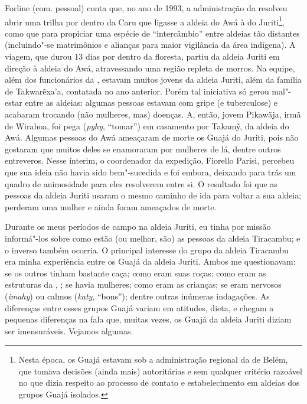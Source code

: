 Forline (com. pessoal) conta que, no ano de 1993, a administração da
 resolveu abrir uma trilha por dentro da  Caru que ligasse a
aldeia do  Awá à do  Juriti\footnote{Nesta época, os Guajá estavam
  sob a administração regional da  de Belém, que tomava decisões
  (ainda mais) autoritárias e sem qualquer critério razoável no que
  dizia respeito ao processo de contato e estabelecimento em aldeias dos
  grupos Guajá isolados.}, como que para propiciar uma espécie de
``intercâmbio'' entre aldeias tão distantes (incluindo"-se matrimônios e
alianças para maior vigilância da área indígena). A viagem, que durou 13
dias por dentro da floresta, partiu da aldeia Juriti em direção à aldeia
do  Awá, atravessando uma região repleta de morros. Na equipe, além
dos funcionários da , estavam muitos jovens da aldeia Juriti, além
da família de Takwarẽxa'a, contatada no ano anterior. Porém tal
iniciativa só gerou mal"-estar entre as aldeias: algumas pessoas estavam
com gripe (e tuberculose) e acabaram trocando (não mulheres, mas)
doenças. A, então, jovem Pikawãja, irmã de Wirahoa, foi pega
(\emph{pyhy}, ``tomar'') em casamento por Takamỹ, da aldeia do  Awá.
Algumas pessoas do  Awá ameaçaram de morte os Guajá do  Juriti,
pois não gostaram que muitos deles se enamoraram por mulheres de lá,
dentre outros entreveros. Nesse ínterim, o coordenador da expedição,
Fiorello Parisi, percebeu que sua ideia não havia sido bem"-sucedida e
foi embora, deixando para trás um quadro de animosidade para eles
resolverem entre si. O resultado foi que as pessoas da aldeia Juriti
usaram o mesmo caminho de ida para voltar a sua aldeia; perderam uma
mulher e ainda foram ameaçados de morte.

Durante os meus períodos de campo na aldeia Juriti, eu tinha por missão
informá"-los sobre como estão (ou melhor, são) as pessoas da aldeia
Tiracambu; e o inverso também ocorria. O principal interesse do grupo da
aldeia Tiracambu era minha experiência entre os Guajá da aldeia Juriti.
Ambos me questionavam: se os outros tinham bastante caça; como eram suas
roças; como eram as estruturas da , ; se havia mulheres; como eram
as crianças; se eram nervosos (\emph{imahy}) ou calmos (\emph{katy},
``bons''); dentre outras inúmeras indagações. As diferenças entre esses
grupos Guajá variam em atitudes, dieta, e chegam a pequenas diferenças
na fala que, muitas vezes, os Guajá da aldeia Juriti diziam ser
imensuráveis. Vejamos algumas.

